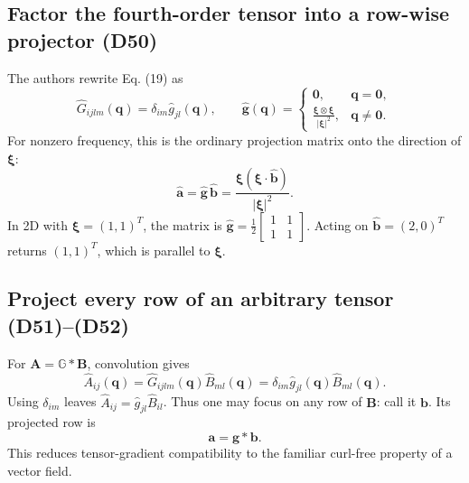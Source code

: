 \documentclass[11pt,a4paper]{article}
\numberwithin{equation}{section}
\newcommand{\Gop}{\mathbb G}
\newcommand{\zero}{\mathbf0}
\newcommand{\Dtag}[1]{\tag{D#1}}
\begin{document}
\subsection{Factor the fourth-order tensor into a row-wise projector (D50)}
The authors rewrite Eq. (19) as
\begin{equation}
\hat G_{ijlm}(\mathbf q)=\delta_{im}\hat g_{jl}(\mathbf q),\qquad
\hat{\mathbf g}(\mathbf q)=
\begin{cases}\mathbf0,&\mathbf q=\zero,\\[3pt]
\displaystyle\frac{\bm\xi\otimes\bm\xi}{|\bm\xi|^2},&\mathbf q\neq\zero.
\end{cases}
\Dtag{50}\label{pd50}\end{equation}
For nonzero frequency, this is the ordinary projection matrix onto the direction of $\bm\xi$:
\[
\hat{\mathbf a}=\hat{\mathbf g}\,\hat{\mathbf b}
=\frac{\bm\xi(\bm\xi\cdot\hat{\mathbf b})}{|\bm\xi|^2}.
\]
In 2D with $\bm\xi=(1,1)^T$, the matrix is $\hat{\mathbf g}=\tfrac12\left[\begin{smallmatrix}1&1\\1&1\end{smallmatrix}\right]$. Acting on $\hat{\mathbf b}=(2,0)^T$ returns $(1,1)^T$, which is parallel to $\bm\xi$.

\subsection{Project every row of an arbitrary tensor (D51)--(D52)}
For $\mathbf A=\Gop*\mathbf B$, convolution gives
\begin{equation}
\hat A_{ij}(\mathbf q)
=\hat G_{ijlm}(\mathbf q)\hat B_{ml}(\mathbf q)
=\delta_{im}\hat g_{jl}(\mathbf q)\hat B_{ml}(\mathbf q).
\Dtag{51}\label{pd51}\end{equation}
Using $\delta_{im}$ leaves $\hat A_{ij}=\hat g_{jl}\hat B_{il}$. Thus one may focus on any row of $\mathbf B$: call it $\mathbf b$. Its projected row is
\begin{equation}
\mathbf a=\mathbf g*\mathbf b.
\Dtag{52}\label{pd52}\end{equation}
This reduces tensor-gradient compatibility to the familiar curl-free property of a vector field.
\end{document}
